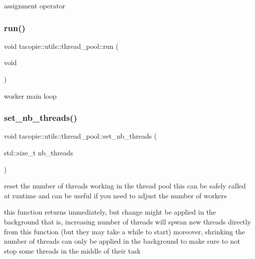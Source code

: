 assignment operator 

\mbox{\label{classtacopie_1_1utils_1_1thread__pool_a6e4ae0994faf97d0d260c1f846ff4639}} 
\subsubsection{\texorpdfstring{run()}{run()}}
{\footnotesize\ttfamily void tacopie\+::utils\+::thread\+\_\+pool\+::run (\begin{DoxyParamCaption}\item[{void}]{ }\end{DoxyParamCaption})\hspace{0.3cm}{\ttfamily [private]}}

worker main loop \mbox{\label{classtacopie_1_1utils_1_1thread__pool_a7c7ae922cedff8fa323828ebb6dea829}} 
\subsubsection{\texorpdfstring{set\+\_\+nb\+\_\+threads()}{set\_nb\_threads()}}
{\footnotesize\ttfamily void tacopie\+::utils\+::thread\+\_\+pool\+::set\+\_\+nb\+\_\+threads (\begin{DoxyParamCaption}\item[{std\+::size\+\_\+t}]{nb\+\_\+threads }\end{DoxyParamCaption})}

reset the number of threads working in the thread pool this can be safely called at runtime and can be useful if you need to adjust the number of workers

this function returns immediately, but change might be applied in the background that is, increasing number of threads will spwan new threads directly from this function (but they may take a while to start) moreover, shrinking the number of threads can only be applied in the background to make sure to not stop some threads in the middle of their task

